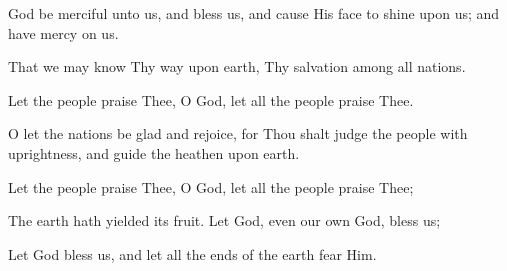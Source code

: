 God be merciful unto us, and bless us, and cause His face to shine upon us; and have mercy on us.

That we may know Thy way upon earth, Thy salvation among all nations.

Let the people praise Thee, O God, let all the people praise Thee.

O let the nations be glad and rejoice, for Thou shalt judge the people with uprightness, and guide the heathen upon earth.

Let the people praise Thee, O God, let all the people praise Thee;

The earth hath yielded its fruit. Let God, even our own God, bless us;

Let God bless us, and let all the ends of the earth fear Him.
